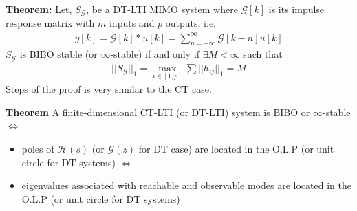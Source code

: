 \documentclass[twoside]{article}
\begin{document}
\textbf{Theorem:} Let, $S_{\mathcal{G}}$, be a DT-LTI MIMO system where $\mathcal{G}[k]$ is its impulse response matrix
with $m$ inputs and $p$ outputs, i.e.
%
\begin{align*}
y[k] = \mathcal{G}[k] * u[k] = \sum\limits_{n=-\infty}^{\infty} \mathcal{G}[k - n] u[k] 
\end{align*}
%
$S_{\mathcal{G}}$ is BIBO stable (or $\infty$-stable) if and only if $\exists M < \infty$ such that 
%
\begin{align*}
	|| S_{\mathcal{G}} ||_1 =\underset{i \in [1,p]}{\max} \sum\limits || h_{ij} ||_1 = M
\end{align*}
%
Steps of the proof is very similar to the CT case.

\textbf{Theorem} A finite-dimensional CT-LTI (or DT-LTI) system is BIBO or $\infty$-stable $\iff$
\begin{itemize}
\item poles of $\mathcal{H}(s)$ (or $\mathcal{G}(z)$ for DT case) are located in the O.L.P (or unit circle for DT systems) $\iff$
\item eigenvalues associated with reachable and observable modes are located in the O.L.P (or unit circle for DT systems)
\end{itemize}



\end{document}
